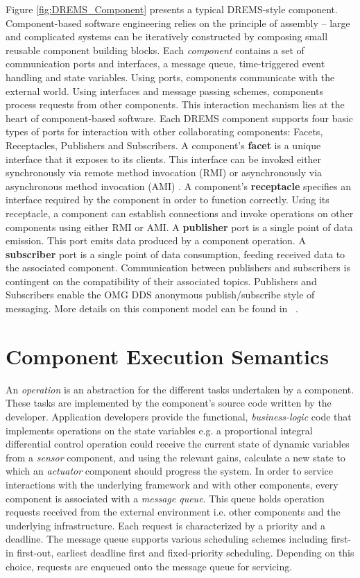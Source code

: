 Figure \ref{fig:DREMS_Component} presents a typical DREMS-style component. Component-based software engineering relies on the principle of assembly -- large and complicated systems can be iteratively constructed by composing small reusable component building blocks. Each \emph{component} contains a set of communication ports and interfaces, a message queue, time-triggered event handling and state variables. Using ports, components communicate with the external world. Using interfaces and message passing schemes, components process requests from other components. This interaction mechanism lies at the heart of component-based software. Each DREMS component supports four basic types of ports for interaction with other collaborating components: Facets, Receptacles, Publishers and Subscribers. A component's {\bf facet} is a unique interface that it exposes to its clients. This interface can be invoked either synchronously via remote method invocation (RMI) or asynchronously via asynchronous method invocation (AMI) \cite{waldo1998remote, raje1997asynchronous}. A component's {\bf receptacle} specifies an interface required by the component in order to function correctly. Using its receptacle, a component can establish connections and invoke operations on other components using either RMI or AMI. A {\bf publisher} port is a single point of data emission. This port emits data produced by a component operation. A {\bf subscriber} port is a single point of data consumption, feeding received data to the associated component. Communication between publishers and subscribers is contingent on the compatibility of their associated topics. Publishers and Subscribers enable the OMG DDS anonymous publish/subscribe \cite{eugster2003many} style of messaging. More details on this component model can be found in ~\cite{ISIS_F6_ISORC:13}.

\section{Component Execution Semantics}

An \emph{operation} is an abstraction for the different tasks undertaken by a component. These tasks are implemented by the component's source code written by the developer. Application developers provide the functional, \emph{business-logic} code that implements operations on the state variables e.g. a proportional integral differential control operation could receive the current state of dynamic variables from a \emph{sensor} component, and using the relevant gains, calculate a new state to which an \emph{actuator} component should progress the system. In order to service interactions with the underlying framework and with other components, every component is associated with a \emph{message queue}. This queue holds operation requests received from the external environment i.e. other components and the underlying infrastructure. Each request is characterized by a priority and a deadline. The message queue supports various scheduling schemes including first-in first-out, earliest deadline first and fixed-priority scheduling. Depending on this choice, requests are enqueued onto the message queue for servicing. 

